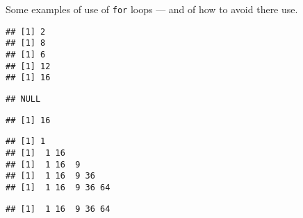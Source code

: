 \documentclass[paper=a4,10pt,div=17,headsepline,BCOR=12mm,twoside,open=right]{scrbook}\usepackage{knitr}
\begin{document}
Some examples of use of \texttt{for} loops --- and of how to avoid there use.

\begin{knitrout}\footnotesize
{}\color{fgcolor}\begin{kframe}
\begin{alltt}
 \hlkwb{<-} \hlstd{(}\hlstd{,} \hlstd{,} \hlstd{,} \hlstd{,} \hlstd{)}
  \hlopt{*} 
   \hlopt{*}\hlstd{)} 
\end{alltt}
\begin{verbatim}
## [1] 2
## [1] 8
## [1] 6
## [1] 12
## [1] 16
\end{verbatim}
\begin{alltt}
 \hlkwb{<-}   \hlopt{*} 
\end{alltt}
\begin{verbatim}
## NULL
\end{verbatim}
\begin{alltt}
   \hlkwb{<-} \hlopt{*} 
\end{alltt}
\begin{verbatim}
## [1] 16
\end{verbatim}
\begin{alltt}
  \hlstd{(}
   \hlkwb{<-} \hlopt{^}
\hlstd{\}}
\end{alltt}
\begin{verbatim}
## [1] 1
## [1]  1 16
## [1]  1 16  9
## [1]  1 16  9 36
## [1]  1 16  9 36 64
\end{verbatim}
\begin{alltt}
 
\end{alltt}
\begin{verbatim}
## [1]  1 16  9 36 64
\end{verbatim}
\begin{alltt}
 \hlkwb{<-} \hlstd{(}

\end{alltt}
\end{kframe}
\end{knitrout}
\end{document}

